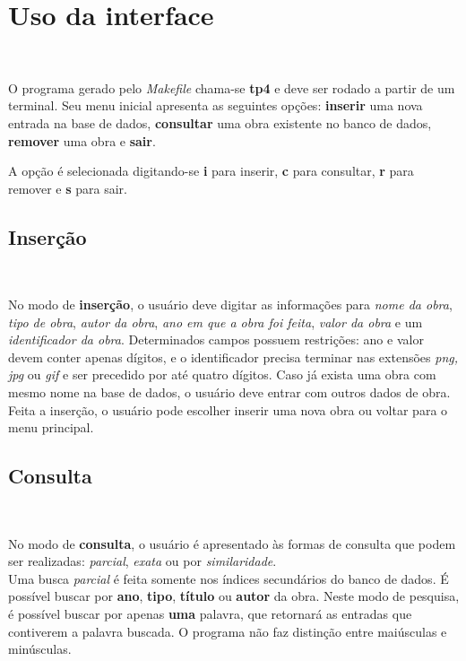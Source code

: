 \documentclass{article}
\begin{document}
\section{Uso da interface}\

O programa gerado pelo \textit{Makefile} chama-se \textbf{tp4} e deve ser rodado a partir de um terminal. Seu menu inicial apresenta as seguintes opções: \textbf{inserir} uma nova entrada na base de dados, \textbf{consultar} uma obra existente no banco de dados, \textbf{remover} uma obra e \textbf{sair}.

A opção é selecionada digitando-se \textbf{i} para inserir, \textbf{c} para consultar, \textbf{r} para remover e \textbf{s} para sair.\\

\subsection{Inserção}\

No modo de \textbf{inserção}, o usuário deve digitar as informações para \textit{nome da obra}, \textit{tipo de obra}, \textit{autor da obra}, \textit{ano em que a obra foi feita}, \textit{valor da obra} e um \textit{identificador da obra}. Determinados campos possuem restrições: ano e valor devem conter apenas dígitos, e o identificador precisa terminar nas extensões \textit{png, jpg} ou \textit{gif} e ser precedido por até quatro dígitos. Caso já exista uma obra com mesmo nome na base de dados, o usuário deve entrar com outros dados de obra. Feita a inserção, o usuário pode escolher inserir uma nova obra ou voltar para o menu principal.\\

\subsection{Consulta}\

No modo de \textbf{consulta}, o usuário é apresentado às formas de consulta que podem ser realizadas: \textit{parcial}, \textit{exata} ou por \textit{similaridade}.\\

Uma busca \textit{parcial} é feita somente nos índices secundários do banco de dados. É possível buscar por \textbf{ano}, \textbf{tipo}, \textbf{título} ou \textbf{autor} da obra. Neste modo de pesquisa, é possível buscar por apenas \textbf{uma} palavra, que retornará as entradas que contiverem a palavra buscada. O programa não faz distinção entre maiúsculas e minúsculas.\\
\end{document}
